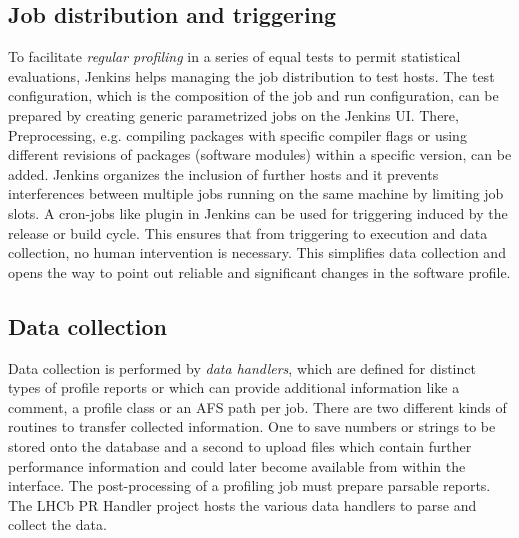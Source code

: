\documentclass[a4paper]{jpconf}
\begin{document}
\subsection{Job distribution and triggering}
\label{sec:job_distribution}

To facilitate \textit{regular profiling} in a series of equal tests to permit statistical evaluations, Jenkins helps managing the job distribution to test hosts. The test configuration, which is the composition of the job and run configuration, can be prepared by creating generic parametrized jobs on the Jenkins UI. There, Preprocessing, e.g. compiling packages with specific compiler flags or using different revisions of packages (software modules) within a specific version, can be added. Jenkins organizes the inclusion of further hosts and it prevents interferences between multiple jobs running on the same machine by limiting job slots.
\newline
A cron-jobs like plugin in Jenkins can be used for triggering induced by the release or build cycle. This ensures that from triggering to execution and data collection, no human intervention is necessary. This simplifies data collection and opens the way to point out reliable and significant changes in the software profile.

\subsection{Data collection}
\label{sec:data_collection}

Data collection is performed by \textit{data handlers}, which are defined for distinct types of profile reports or which can provide additional information like a comment, a profile class or an AFS path per job. There are two different kinds of routines to transfer collected information. One to save numbers or strings to be stored onto the database and a second to upload files which contain further performance information and could later become available from within the interface. The post-processing of a profiling job must prepare parsable reports. The LHCb PR Handler project hosts the various data handlers to parse and collect the data.
\end{document}
